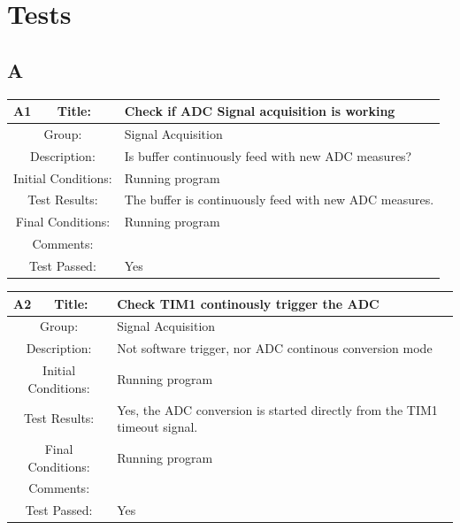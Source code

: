 \documentclass[12pt]{article}
\begin{document}
	\section{Tests}
	\subsection{A}
		\begin{table}[H]
			\begin{center}
				\begin{tabular}{| m{2cm}|m{2cm}|m{12cm}|}
					\hline 
					\bf A1&\bf Title:&\bf Check if ADC Signal acquisition is working\\ 
					\hline 
					\multicolumn{2}{|c|}{Group:}&Signal Acquisition\\ 
					\hline 
					\multicolumn{2}{|c|}{Description:}&Is buffer continuously feed with new ADC measures?
					\\ 
					\hline 
					\multicolumn{2}{|c|}{Initial Conditions:}&Running program\\ 
					\hline 
					\multicolumn{2}{|c|}{Test Results:}&The buffer is continuously feed with new ADC measures.\\ 
					\hline 
					\multicolumn{2}{|c|}{Final Conditions:}&Running program\\ 
					\hline 
					\multicolumn{2}{|c|}{Comments:}&\\ 
					\hline 
					\multicolumn{2}{|c|}{Test Passed:}&Yes\\ 
					\hline 
				\end{tabular} 
			\end{center}
		\end{table}
	
		\begin{table}[H]
			\begin{center}
				\begin{tabular}{| m{2cm}|m{2cm}|m{12cm}|}
					\hline 
					\bf A2&\bf Title:&\bf Check TIM1 continously trigger the ADC\\ 
					\hline 
					\multicolumn{2}{|c|}{Group:}&Signal Acquisition\\ 
					\hline 
					\multicolumn{2}{|c|}{Description:}&Not software trigger, nor ADC continous conversion mode\\ 
					\hline 
					\multicolumn{2}{|c|}{Initial Conditions:}&Running program\\ 
					\hline 
					\multicolumn{2}{|c|}{Test Results:}&Yes, the ADC conversion is started directly from the TIM1 timeout signal.\\ 
					\hline 
					\multicolumn{2}{|c|}{Final Conditions:}&Running program\\ 
					\hline 
					\multicolumn{2}{|c|}{Comments:}&\\ 
					\hline 
					\multicolumn{2}{|c|}{Test Passed:}&Yes\\ 
					\hline 
				\end{tabular} 
			\end{center}
		\end{table}	
	
\end{document}
